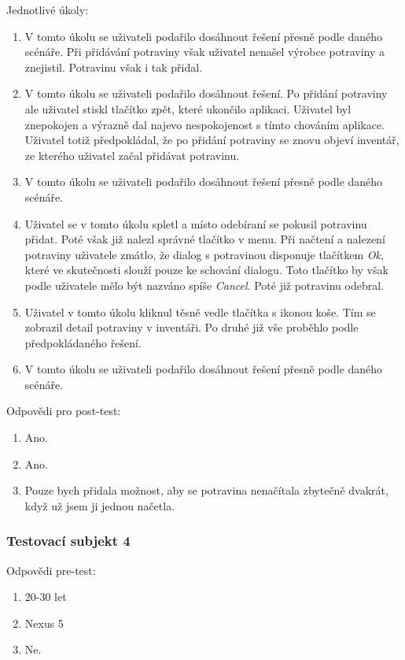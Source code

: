 \documentclass[thesis=B,czech]{FITthesis}[2013/10/20]
\begin{document}
Jednotlivé úkoly:
\begin{enumerate}
  \item V tomto úkolu se uživateli podařilo dosáhnout řešení přesně podle daného scénáře. Při přidávání potraviny však uživatel nenašel výrobce potraviny a znejistil. Potravinu však i tak přidal.
  \item V tomto úkolu se uživateli podařilo dosáhnout řešení. Po přidání potraviny ale uživatel stiskl tlačítko zpět, které ukončilo aplikaci. Uživatel byl znepokojen a výrazně dal najevo nespokojenost s tímto chováním aplikace. Uživatel totiž předpokládal, že po přidání potraviny se znovu objeví inventář, ze kterého uživatel začal přidávat potravinu.
  \item V tomto úkolu se uživateli podařilo dosáhnout řešení přesně podle daného scénáře.
  \item Uživatel se v tomto úkolu spletl a místo odebíraní se pokusil potravinu přidat. Poté však již nalezl správné tlačítko v menu. Při načtení a nalezení potraviny uživatele zmátlo, že dialog s potravinou disponuje tlačítkem \textit{Ok}, které ve skutečnosti slouží pouze ke schování dialogu. Toto tlačítko by však podle uživatele mělo být nazváno spíše \textit{Cancel}. Poté již potravinu odebral.
  \item Uživatel v tomto úkolu kliknul těsně vedle tlačítka s ikonou koše. Tím se zobrazil detail potraviny v inventáři. Po druhé již vše proběhlo podle předpokládaného řešení.
  \item V tomto úkolu se uživateli podařilo dosáhnout řešení přesně podle daného scénáře.
\end{enumerate}

Odpovědi pro post-test:
\begin{enumerate}
  \item Ano.
  \item Ano.
  \item Pouze bych přidala možnost, aby se potravina nenačítala zbytečně dvakrát, když už jsem ji jednou načetla.
\end{enumerate}

\subsubsection{Testovací subjekt 4}

Odpovědi pre-test:

\begin{enumerate}
  \item 20-30 let
  \item Nexus 5
  \item Ne.
\end{enumerate}
\end{document}
